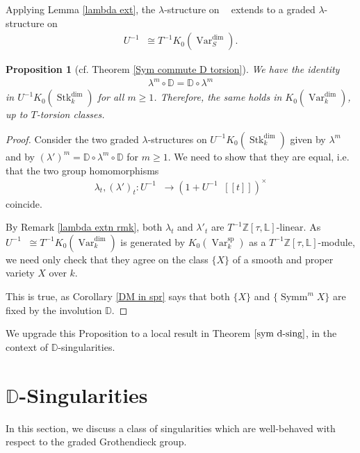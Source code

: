 \documentclass{amsart}
\newtheorem{prop}[thm]{Proposition}
\theoremstyle{definition}
\DeclareMathOperator{\Var}{Var}
\DeclareMathOperator{\spr}{sp}
\DeclareMathOperator{\Stk}{Stk}
\DeclareMathOperator{\Symm}{Symm}
\newcommand{\Kdim}{K_0(\Var_k^{\dim})}
\newcommand{\KdimS}{K_0(\Var_S^{\dim})}
\newcommand{\Kspr}{K_0(\Var_k^{\spr})}
\DeclareMathOperator{\Kstk}{K_0(\Stk_k^{\dim})}
\DeclareMathOperator{\KstkS}{K_0(\Stk_S^{\dim})}
\numberwithin{equation}{section}
\begin{document}
Applying Lemma \ref{lambda ext}, the $\lambda$-structure on $\Kstk$ extends to a graded $\lambda$-structure on
\begin{align*}
    U^{-1} \KstkS \cong T^{-1} \KdimS.
\end{align*}


\begin{prop}[cf. Theorem \ref{Sym commute D torsion}]
We have the identity
\begin{align*}
    \lambda^m \circ \mathbb{D} = \mathbb{D} \circ \lambda^m
\end{align*}
in $U^{-1}K_0(\Stk_k^{\dim})$ for all $m \geq 1$. Therefore, the same holds in $\Kdim$, up to $T$-torsion classes.
\end{prop}

\begin{proof}
Consider the two graded $\lambda$-structures on $U^{-1}K_0(\Stk_k^{\dim})$ given by $\lambda^m$ and by $(\lambda')^m = \mathbb{D} \circ \lambda^m \circ \mathbb{D}$ for $m \geq 1$. We need to show that they are equal, i.e. that the two group homomorphisms
\begin{align*}
    \lambda_t, (\lambda')_t: U^{-1}\Kstk \rightarrow (1+U^{-1}\Kstk[[t]])^\times
\end{align*}
coincide. 

By Remark \ref{lambda extn rmk}, both $\lambda_t$ and $\lambda'_t$ are $T^{-1}\mathbb{Z}[\tau, \mathbb{L}]$-linear. As $U^{-1} \Kstk \cong T^{-1} \Kdim$ is generated by $\Kspr$ as a $T^{-1} \mathbb{Z}[\tau, \mathbb{L}]$-module, we need only check that they agree on the class $\{ X \}$ of a smooth and proper variety $X$ over $k$.

This is true, as Corollary \ref{DM in spr} says that both $\{ X \}$ and $\{ \Symm^m X \}$ are fixed by the involution $\mathbb{D}$.
\end{proof}
We upgrade this Proposition to a local result in Theorem $\ref{sym d-sing}$, in the context of $\mathbb{D}$-singularities.







\section{\texorpdfstring{$\mathbb{D}$}{��}-Singularities}\label{D sing section}

In this section, we discuss a class of singularities which are well-behaved with respect to the graded Grothendieck group.
\end{document}
